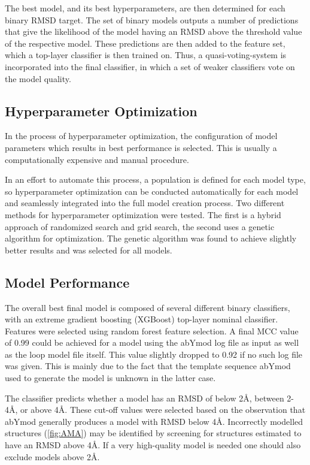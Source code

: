 \documentclass[12pt]{article}
\begin{document}
The best model, and its best hyperparameters, are then determined for
each binary RMSD target. The set of binary models outputs a number of
predictions that give the likelihood of the model having an RMSD above
the threshold value of the respective model. These predictions are
then added to the feature set, which a top-layer classifier is then
trained on. Thus, a quasi-voting-system is incorporated into the final
classifier, in which a set of weaker classifiers vote on the model
quality.

\subsection{Hyperparameter Optimization}
In the process of hyperparameter optimization, the configuration of
model parameters which results in best performance is selected. This
is usually a computationally expensive and manual procedure.

In an effort to automate this process, a population is defined for
each model type, so hyperparameter optimization can be conducted
automatically for each model and seamlessly integrated into the full
model creation process. Two different methods for hyperparameter
optimization were tested. The first is a hybrid approach of randomized
search and grid search, the second uses a genetic algorithm for
optimization. The genetic algorithm was found to achieve slightly
better results and was selected for all models.

\subsection{Model Performance}
The overall best final model is composed of several different binary
classifiers, with an extreme gradient boosting (XGBoost) top-layer
nominal classifier. Features were selected using random forest feature
selection. A final MCC value of 0.99 could be achieved for a model
using the abYmod log file as input as well as the loop model file
itself. This value slightly dropped to 0.92 if no such log file was
given. This is mainly due to the fact that the template sequence
abYmod used to generate the model is unknown in the latter case.

The classifier predicts whether a model has an RMSD of below 2\AA,
between 2-4\AA, or above 4\AA. These cut-off values were selected
based on the observation that abYmod generally produces a model with
RMSD below 4\AA. Incorrectly modelled structures (\ref{fig:AMA}) may
be identified by screening for structures estimated to have an RMSD
above 4\AA. If a very high-quality model is needed one should also
exclude models above 2\AA.
\end{document}
